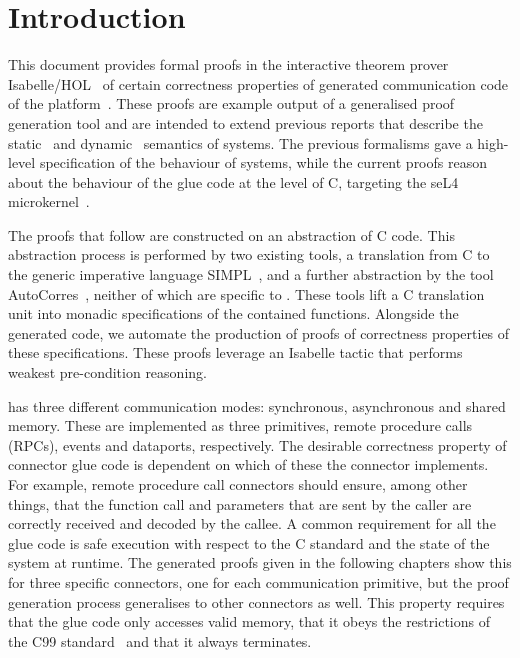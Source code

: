 %
%
%
%

\chapter{Introduction}

This document provides formal proofs in the interactive theorem prover
Isabelle/HOL~\cite{Nipkow_PW:Isabelle} of certain correctness properties of
generated communication code of the \camkes platform~\cite{Kuz_LGH_07}.
These proofs are example output of a generalised proof generation tool and
are intended to extend previous reports that describe the
static~\cite{Fernandez_KKM_13:tr} and dynamic~\cite{Fernandez_GAKK_13:tr}
semantics of \camkes systems.
The previous formalisms gave a high-level specification of the behaviour of
\camkes systems, while the current proofs reason about the behaviour of the
glue code at the level of C, targeting the seL4
microkernel~\cite{Klein_EHACDEEKNSTW_09}.

The proofs that follow are constructed on an abstraction of C code.
This abstraction process is performed by two existing
tools, a translation from C to the generic imperative language
SIMPL~\cite{Winwood_KSACN_09}, and a further abstraction by the tool
AutoCorres~\cite{Greenaway_LAK_14}, neither of which are specific
to \camkes.
These tools lift a C translation unit into monadic specifications of the
contained functions.
Alongside the generated code, we automate the production of proofs of
correctness properties of these specifications.
These proofs leverage an Isabelle
tactic that performs weakest pre-condition reasoning.

\camkes has three different communication modes: synchronous, asynchronous and
shared memory.
These are implemented as three \camkes primitives, remote procedure calls
(RPCs), events and dataports, respectively.
The desirable correctness property of connector glue code is dependent on which
of these the connector implements.
For example, remote procedure call connectors should ensure, among other
things, that the function call and parameters that are sent by the caller are
correctly received and decoded by the callee.
A common requirement for all the glue code is safe execution with respect to
the C standard and the state of the system at runtime.
The generated proofs given in the following chapters show this for three
specific connectors, one for each \camkes communication primitive, but the
proof generation process generalises to other \camkes connectors as well.
This property requires that the glue code only accesses valid memory, that it
obeys the restrictions of the C99 standard~\cite{C99} and that it always
terminates.

